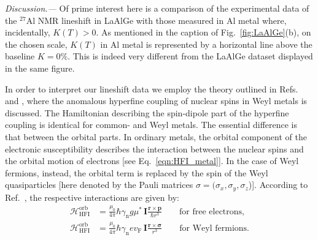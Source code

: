 \documentclass[aps,prb,a4paper,10pt,twocolumn,showpacs,floatfix,superscriptaddress,preprintnumbers,longbibliography]{revtex4-2}
\begin{document}
\emph{Discussion.---} 
Of prime interest here is a comparison of the experimental data of the 
$^{27}$Al NMR lineshift in LaAlGe with those measured in Al metal
\cite{bennett1970relevance} where, incidentally, $K(T) > 0$. As mentioned
in the caption of Fig.~\ref{fig:LaAlGe}(b), on the chosen scale, $K(T)$
in Al metal is represented by a horizontal line above %
the baseline $K = 0\%$. This is indeed very different from the LaAlGe
dataset displayed in the same figure.

In order to interpret our lineshift data we employ the theory
outlined in Refs.~\cite{okvatovity2016anomalous} and
\cite{Okvtovity2019nuclear}, where the anomalous hyperfine coupling of
nuclear spins in Weyl metals is discussed. The Hamiltonian describing
the spin-dipole part of the hyperfine coupling is identical for common-
and Weyl metals. The essential difference is that between the orbital parts.
In ordinary metals, the orbital component of the electronic susceptibility
describes the interaction between the nuclear spins and the orbital
motion of electrons [see Eq.~\eqref{eqn:HFI_metal}]. In the case of Weyl fermions,
instead, the orbital term is replaced by the spin of the Weyl quasiparticles
[here denoted by the Pauli matrices $\sigma=(\sigma_{x},\sigma_{y},\sigma_{z}$)]. 
According to Ref.~\cite{okvatovity2016anomalous}, the respective
interactions are given by:
%
%
\begin{align}
\mathscr{H}_{\mathrm{HFI}}^{\mathrm{orb}} &= \frac{\mu_{0}}{4 \pi} \hbar \gamma_{\mathrm{n}} g \mu^{*} \, \boldsymbol{I} \frac{\boldsymbol{r} \times \boldsymbol{p}}{\hbar r^{3}} \qquad \text{for free electrons,} \label{eqn:HFI_metal} \\[3mm]
%
\mathscr{H}_{\mathrm{HFI}}^{\mathrm{orb}} &= \frac{\mu_{0}}{4 \pi} \hbar \gamma_{\mathrm{n}} e v_{\mathrm{F}} \, \boldsymbol{I} \frac{\boldsymbol{r} \times \boldsymbol{\sigma}}{r^{3}} \qquad \text{for Weyl fermions.}
\label{eqn:HFI_weyl}
\end{align}
\end{document}
